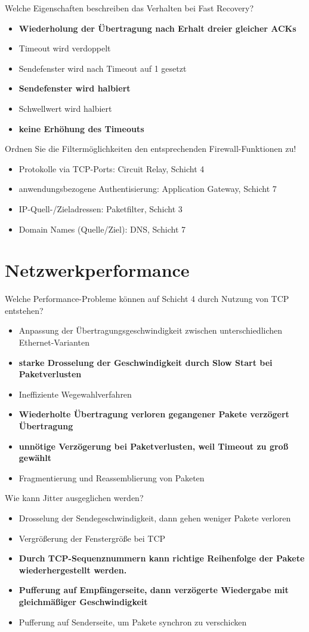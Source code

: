 \documentclass{article}
\begin{document}
 	Welche Eigenschaften beschreiben das Verhalten bei Fast Recovery?
 	\begin{itemize}
 		\item \textbf{Wiederholung der Übertragung nach Erhalt dreier gleicher ACKs}
 		\item Timeout wird verdoppelt
 		\item Sendefenster wird nach Timeout auf 1 gesetzt
 		\item \textbf{Sendefenster wird halbiert }
 		\item Schwellwert wird halbiert
 		\item \textbf{keine Erhöhung des Timeouts}
 	\end{itemize}
 
 	Ordnen Sie die Filtermöglichkeiten den entsprechenden Firewall-Funktionen zu!
 	\begin{itemize}
 		\item Protokolle via TCP-Ports: Circuit Relay, Schicht 4 
 		\item anwendungsbezogene Authentisierung: Application Gateway, Schicht 7 
 		\item IP-Quell-/Zieladressen: Paketfilter, Schicht 3 
 		\item Domain Names (Quelle/Ziel): DNS, Schicht 7 
 	\end{itemize}
	
	\section{Netzwerkperformance}
	
	Welche Performance-Probleme können auf Schicht 4 durch Nutzung von TCP entstehen?
	\begin{itemize}
		\item Anpassung der Übertragungsgeschwindigkeit zwischen unterschiedlichen Ethernet-Varianten
		\item \textbf{starke Drosselung der Geschwindigkeit durch Slow Start bei Paketverlusten}
		\item Ineffiziente Wegewahlverfahren
		\item \textbf{Wiederholte Übertragung verloren gegangener Pakete verzögert Übertragung}
		\item \textbf{unnötige Verzögerung bei Paketverlusten, weil Timeout zu groß gewählt}
		\item Fragmentierung und Reassemblierung von Paketen
	\end{itemize}

	Wie kann Jitter ausgeglichen werden?
	\begin{itemize}
		\item Drosselung der Sendegeschwindigkeit, dann gehen weniger Pakete verloren
		\item Vergrößerung der Fenstergröße bei TCP
		\item \textbf{Durch TCP-Sequenznummern kann richtige Reihenfolge der Pakete wiederhergestellt werden.}
		\item \textbf{Pufferung auf Empfängerseite, dann verzögerte Wiedergabe mit gleichmäßiger Geschwindigkeit}
		\item Pufferung auf Senderseite, um Pakete synchron zu verschicken
	\end{itemize}
\end{document}
